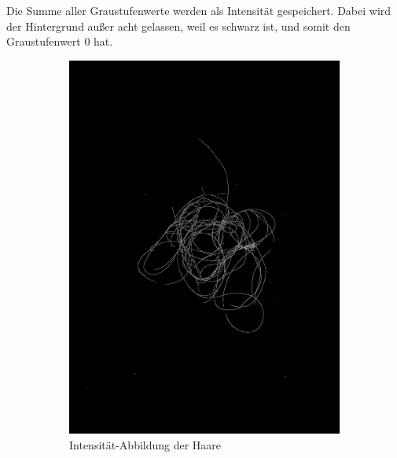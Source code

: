 \documentclass[german,a4paper,12pt,smallheadings,headsepline, titlepage, liststotoc, idextotoc,bibtoctoc,blibliography = totocnumbered]{scrartcl}
\begin{document}
Die Summe aller Graustufenwerte werden als Intensität gespeichert. Dabei wird der Hintergrund außer acht gelassen, weil es schwarz ist, und somit den Graustufenwert 0 hat.
\begin{figure}
	\centering
	\begin{subfigure}[b]{0.475\textwidth}
		\centering
		\includegraphics[width=\textwidth]{fig64/05intenstiy.png}
		\caption[]{Intensität-Abbildung der Haare}
		\label{img:Intensity}
	\end{subfigure}
	\hfill
	\begin{subfigure}[b]{0.475\textwidth} 
		\centering

\end{subfigure}
\end{figure}
\end{document}
